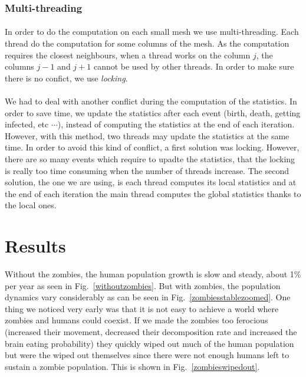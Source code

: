 \documentclass{report}
\begin{document}
\subsubsection{Multi-threading}
\paragraph{}
In order to do the computation on each small mesh we use multi-threading. Each thread do the computation for some columns of the mesh. As the computation requires the closest neighbours, when a thread works on the column $j$, the columns $j-1$ and $j+1$ cannot be used by other threads. In order to make sure there is no confict, we use \emph{locking}.
\paragraph{}
We had to deal with another conflict during the computation of the statistics. In order to save time, we update the statistics after each event (birth, death, getting infected, etc $\cdots$), instead of computing the statistics at the end of each iteration. However, with this method, two threads may update the statistics at the same time. In order to avoid this kind of conflict, a first solution was locking. However, there are so many events which require to upadte the statistics, that the locking is really too time consuming when the number of threads increase. The second solution, the one we are using, is each thread computes its local statistics and at the end of each iteration the main thread computes the global statistics thanks to the local ones.
 





\section{Results}


Without the zombies, the human population growth is slow and steady, about 1\% per year as seen in Fig.~\ref{withoutzombies}. But with zombies, the population dynamics vary considerably as can be seen in Fig.~\ref{zombiesstablezoomed}. One thing we noticed very early was that it is not easy to achieve a world where zombies and humans could coexist. If we made the zombies too ferocious (increased their movement, decreased their decomposition rate and increased the brain eating probability) they quickly wiped out much of the human population but were the wiped out themselves since there were not enough humans left to sustain a zombie population. This is shown in Fig.~\ref{zombieswipedout}.
\end{document}
